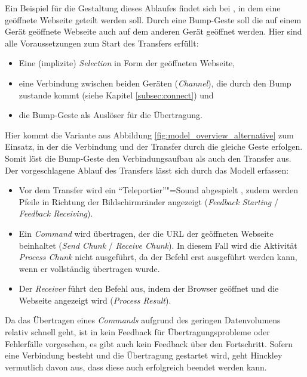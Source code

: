 Ein Beispiel für die Gestaltung dieses Ablaufes findet sich bei \citep{Hinckley2003}, in dem eine geöffnete Webseite geteilt werden soll. Durch eine Bump-Geste soll die auf einem Gerät geöffnete Webseite auch auf dem anderen Gerät geöffnet werden. Hier sind alle Voraussetzungen zum Start des Transfers erfüllt:
\begin{itemize}
\item Eine (implizite) \textit{Selection} in Form der geöffneten Webseite,
\item eine Verbindung zwischen beiden Geräten (\textit{Channel}), die durch den Bump zustande kommt (siehe Kapitel \ref{subsec:connect}) und
\item die Bump-Geste als Auslöser für die Übertragung.
\end{itemize} 
Hier kommt die Variante aus Abbildung \ref{fig:model_overview_alternative} zum Einsatz, in der die Verbindung und der Transfer durch die gleiche Geste erfolgen. Somit löst die Bump-Geste den Verbindungsaufbau als auch den Transfer aus. Der vorgeschlagene Ablauf des Transfers lässt sich durch das Modell erfassen:
\begin{itemize}
\item Vor dem Transfer wird ein "`Teleportier"'"=Sound abgespielt \citep{Hinckley2003}, zudem werden Pfeile in Richtung der Bildschirmränder angezeigt (\textit{Feedback Starting} / \textit{Feedback Receiving}).
\item Ein \textit{Command} wird übertragen, der die URL der geöffneten Webseite beinhaltet (\textit{Send Chunk} / \textit{Receive Chunk}). In diesem Fall wird die Aktivität \textit{Process Chunk} nicht ausgeführt, da der Befehl erst ausgeführt werden kann, wenn er vollständig übertragen wurde.
\item Der \textit{Receiver} führt den Befehl aus, indem der Browser geöffnet und die Webseite angezeigt wird (\textit{Process Result}).
\end{itemize}

Da das Übertragen eines \textit{Commands} aufgrund des geringen Datenvolumens relativ schnell geht, ist in \citep{Hinckley2003} kein Feedback für Übertragungsprobleme oder Fehlerfälle vorgesehen, es gibt auch kein Feedback über den Fortschritt. Sofern eine Verbindung besteht und die Übertragung gestartet wird, geht Hinckley vermutlich davon aus, dass diese auch erfolgreich beendet werden kann.

